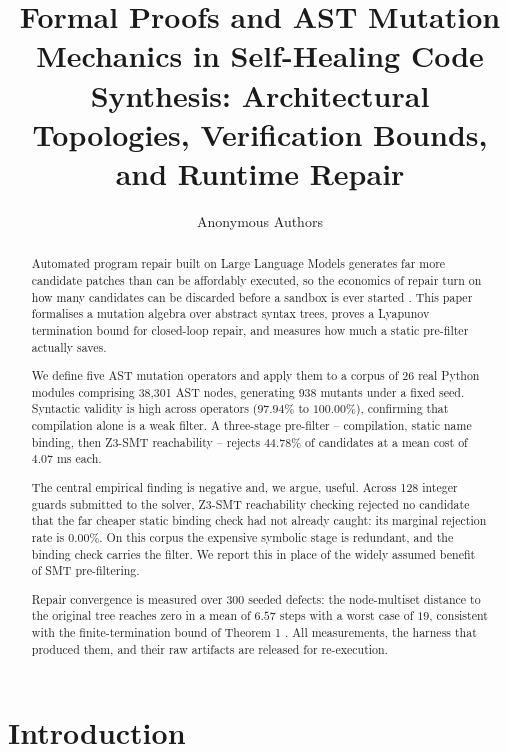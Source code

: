 \documentclass[10pt,twocolumn,letterpaper]{article}
\begin{document}
\title{Formal Proofs and AST Mutation Mechanics in Self-Healing Code Synthesis: Architectural Topologies, Verification Bounds, and Runtime Repair}

\author{
Anonymous Authors
}

\maketitle

\begin{abstract}
Automated program repair built on Large Language Models generates far more candidate patches than can be affordably executed, so the economics of repair turn on how many candidates can be discarded before a sandbox is ever started \cite{arxiv_2405_01543,arxiv_2010_11146}. This paper formalises a mutation algebra over abstract syntax trees, proves a Lyapunov termination bound for closed-loop repair, and measures how much a static pre-filter actually saves.

We define five AST mutation operators and apply them to a corpus of 26 real Python modules comprising 38{,}301 AST nodes, generating 938 mutants under a fixed seed. Syntactic validity is high across operators ($97.94\%$ to $100.00\%$), confirming that compilation alone is a weak filter. A three-stage pre-filter -- compilation, static name binding, then Z3-SMT reachability -- rejects $44.78\%$ of candidates at a mean cost of $4.07$ ms each.

The central empirical finding is negative and, we argue, useful. Across 128 integer guards submitted to the solver, Z3-SMT reachability checking rejected no candidate that the far cheaper static binding check had not already caught: its marginal rejection rate is $0.00\%$. On this corpus the expensive symbolic stage is redundant, and the binding check carries the filter. We report this in place of the widely assumed benefit of SMT pre-filtering.

Repair convergence is measured over 300 seeded defects: the node-multiset distance to the original tree reaches zero in a mean of $6.57$ steps with a worst case of $19$, consistent with the finite-termination bound of Theorem 1 \cite{arxiv_2501_02497}. All measurements, the harness that produced them, and their raw artifacts are released for re-execution.
\end{abstract}






\section{Introduction}
\end{document}
